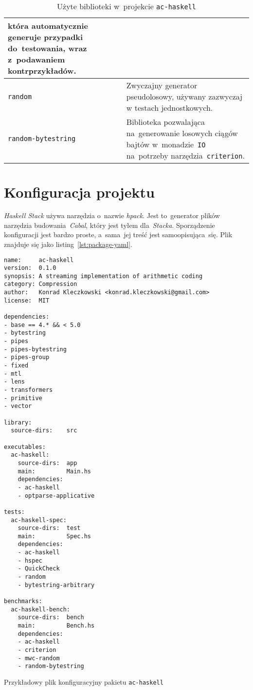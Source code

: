 \documentclass[../../praca.tex]{subfiles}
\begin{document}
\begin{table}[p]
\begin{tabular}{|l|p{8cm}|}
                                  która automatycznie generuje przypadki do~testowania, wraz z~podawaniem kontrprzykładów. \\ \hline
    \texttt{random}             & Zwyczajny generator pseudolosowy, używany 
                                  zazwyczaj w testach jednostkowych. \\ \hline
    \texttt{random-bytestring}  & Biblioteka pozwalająca na~generowanie losowych ciągów bajtów
                                  w~monadzie~\texttt{IO} na~potrzeby narzędzia~\texttt{criterion}. \\ \hline
  \end{tabular}
  \caption{Użyte biblioteki w~projekcie \texttt{ac-haskell}}
  \label{tab:libs}
\end{table}

\section{Konfiguracja projektu}

\emph{Haskell Stack} używa narzędzia o~nazwie \emph{hpack}. 
Jest to~generator plików narzędzia budowania~\emph{Cabal},
który jest tyłem dla~\emph{Stacka}. Sporządzenie konfiguracji
jest bardzo proste, a~sama~jej treść jest samoopisująca~się. 
Plik znajduje się jako listing~\ref{lst:package-yaml}.


\begin{listing}
  \begin{verbatim}
name:     ac-haskell
version:  0.1.0
synopsis: A streaming implementation of arithmetic coding
category: Compression
author:   Konrad Kleczkowski <konrad.kleczkowski@gmail.com>
license:  MIT

dependencies:
- base == 4.* && < 5.0
- bytestring
- pipes
- pipes-bytestring
- pipes-group
- fixed
- mtl
- lens
- transformers
- primitive
- vector

library:
  source-dirs:    src

executables:
  ac-haskell:
    source-dirs:  app
    main:         Main.hs
    dependencies:
    - ac-haskell
    - optparse-applicative

tests:
  ac-haskell-spec:
    source-dirs:  test
    main:         Spec.hs
    dependencies:
    - ac-haskell
    - hspec
    - QuickCheck
    - random
    - bytestring-arbitrary

benchmarks:
  ac-haskell-bench:
    source-dirs:  bench
    main:         Bench.hs
    dependencies:
    - ac-haskell
    - criterion
    - mwc-random
    - random-bytestring
  \end{verbatim}
  \caption{Przykładowy plik konfiguracyjny pakietu \texttt{ac-haskell}}
  \label{lst:package-yaml}
\end{listing}
\end{document}
